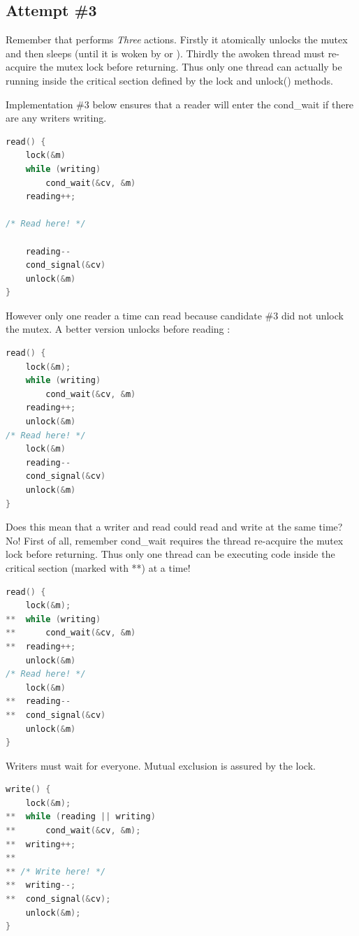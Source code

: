 \subsection{Attempt \#3}\label{attempt-3}

Remember that  performs \emph{Three} actions. Firstly it atomically unlocks the mutex and then sleeps (until it is woken by  or ). Thirdly the awoken thread must re-acquire the mutex lock before returning. Thus only one thread can actually be running inside the critical section defined by the lock and unlock() methods.

Implementation \#3 below ensures that a reader will enter the cond\_wait if there are any writers writing.

\begin{lstlisting}[language=C]
read() {
    lock(&m)
    while (writing)
        cond_wait(&cv, &m)
    reading++;

/* Read here! */

    reading--
    cond_signal(&cv)
    unlock(&m)
}
\end{lstlisting}

However only one reader a time can read because candidate \#3 did not unlock the mutex. A better version unlocks before reading :

\begin{lstlisting}[language=C]
read() {
    lock(&m);
    while (writing)
        cond_wait(&cv, &m)
    reading++;
    unlock(&m)
/* Read here! */
    lock(&m)
    reading--
    cond_signal(&cv)
    unlock(&m)
}
\end{lstlisting}

Does this mean that a writer and read could read and write at the same time? No! First of all, remember cond\_wait requires the thread re-acquire the mutex lock before returning. Thus only one thread can be executing code inside the critical section (marked with **) at a time!

\begin{lstlisting}[language=C]
read() {
    lock(&m);
**  while (writing)
**      cond_wait(&cv, &m)
**  reading++;
    unlock(&m)
/* Read here! */
    lock(&m)
**  reading--
**  cond_signal(&cv)
    unlock(&m)
}
\end{lstlisting}

Writers must wait for everyone. Mutual exclusion is assured by the lock.

\begin{lstlisting}[language=C]
write() {
    lock(&m);
**  while (reading || writing)
**      cond_wait(&cv, &m);
**  writing++;
**
** /* Write here! */
**  writing--;
**  cond_signal(&cv);
    unlock(&m);
}
\end{lstlisting}

